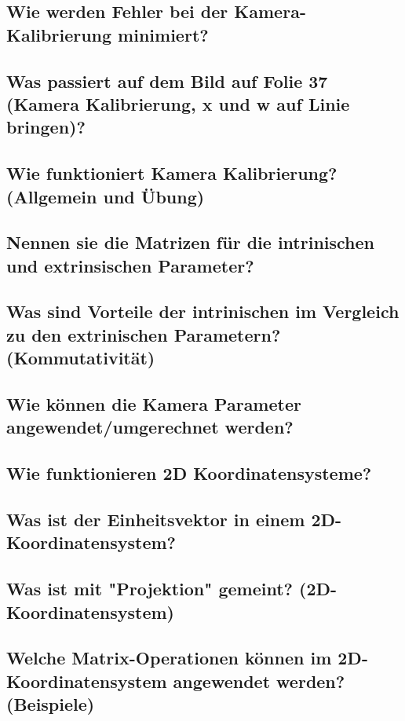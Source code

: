\subsection{Wie werden Fehler bei der Kamera-Kalibrierung minimiert?}

\subsection{Was passiert auf dem Bild auf Folie 37 (Kamera Kalibrierung, x und w auf Linie bringen)?}

\subsection{Wie funktioniert Kamera Kalibrierung? (Allgemein und Übung)}

\subsection{Nennen sie die Matrizen für die intrinischen und extrinsischen Parameter?}

\subsection{Was sind Vorteile der intrinischen im Vergleich zu den extrinischen Parametern? (Kommutativität)}

\subsection{Wie können die Kamera Parameter angewendet/umgerechnet werden?}

\subsection{Wie funktionieren 2D Koordinatensysteme?}

\subsection{Was ist der Einheitsvektor in einem 2D-Koordinatensystem?}

\subsection{Was ist mit "Projektion" gemeint? (2D-Koordinatensystem)}

\subsection{Welche Matrix-Operationen können im 2D-Koordinatensystem angewendet werden? (Beispiele)}


